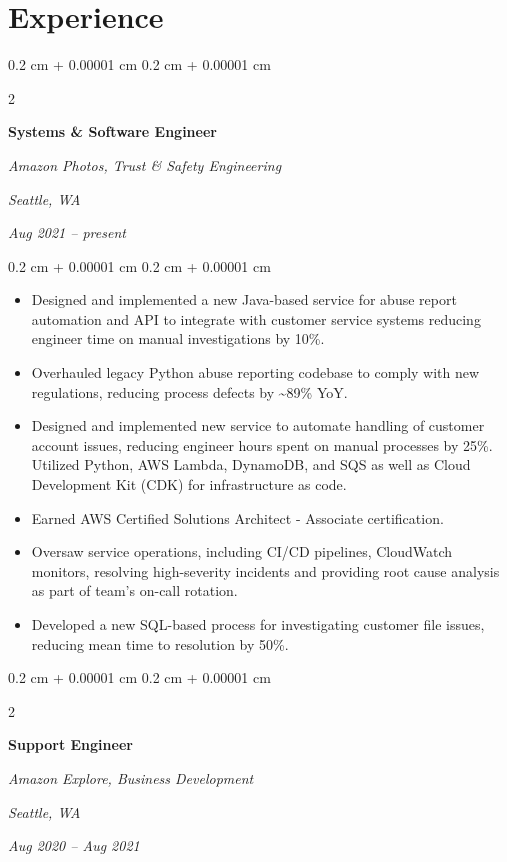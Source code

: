 \documentclass[10pt, letterpaper]{article}
\newenvironment{highlights}{
    \begin{itemize}[
        topsep=0.10 cm,
        parsep=0.10 cm,
        partopsep=0pt,
        itemsep=0pt,
        leftmargin=0.4 cm + 10pt
    ]
}{
    \end{itemize}
} %
\newenvironment{onecolentry}{
    \begin{adjustwidth}{
        0.2 cm + 0.00001 cm
    }{
        0.2 cm + 0.00001 cm
    }
}{
    \end{adjustwidth}
} %
\newenvironment{twocolentry}[2][]{
    \onecolentry
    \def\secondColumn{#2}
    \setcolumnwidth{\fill, 4.5 cm}
    \begin{paracol}{2}
}{
    \switchcolumn \raggedleft \secondColumn
    \end{paracol}
    \endonecolentry
} %
\begin{document}
    
    \section{Experience}



        
        \begin{twocolentry}{
        \textit{Seattle, WA}    
            
        \textit{Aug 2021 – present}}
            \textbf{Systems \& Software Engineer}
            
            \textit{Amazon Photos, Trust \& Safety Engineering}
        \end{twocolentry}

        \vspace{0.10 cm}
        \begin{onecolentry}
            \begin{highlights}
                \item Designed and implemented a new Java-based service for abuse report automation and API to integrate with customer service systems reducing engineer time on manual investigations by 10\%.
                \item Overhauled legacy Python abuse reporting codebase to comply with new regulations, reducing process defects by \textasciitilde{}89\% YoY.
                \item Designed and implemented new service to automate handling of customer account issues, reducing engineer hours spent on manual processes by 25\%. Utilized Python, AWS Lambda, DynamoDB, and SQS as well as Cloud Development Kit (CDK) for infrastructure as code.
                \item Earned AWS Certified Solutions Architect - Associate certification.
                \item Oversaw service operations, including CI/CD pipelines, CloudWatch monitors, resolving high-severity incidents and providing root cause analysis as part of team’s on-call rotation.
                \item Developed a new SQL-based process for investigating customer file issues, reducing mean time to resolution by 50\%.
            \end{highlights}
        \end{onecolentry}


        \vspace{0.2 cm}

        \begin{twocolentry}{
        \textit{Seattle, WA}    
            
        \textit{Aug 2020 – Aug 2021}}
            \textbf{Support Engineer}
            
            \textit{Amazon Explore, Business Development}
        \end{twocolentry}
\end{document}
